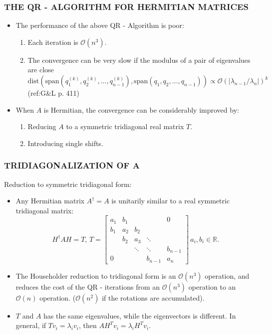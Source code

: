 \documentclass[a4paper,8pt]{beamer} %
\newcommand{\smatrix}[1]{\left[\begin{matrix} #1 \end{matrix}\right]}
\begin{document}
\begin{frame}[label=framelb1]  %
\frametitle{THE QR - ALGORITHM FOR HERMITIAN MATRICES }
\begin{itemize}
\item The performance of the above QR - Algorithm is poor:
	\begin{enumerate}
		\item Each iteration is $\mathcal O(n^3)$.
		\item The convergence can be very slow if the modulus of a pair of eigenvalues are close
		\[ \text{dist}(\text{span}(q_1^{(k)},q_2^{(k)},\dots,q_{n-1}^{(k)})
		,\text{span}(q_1,q_2,\dots,q_{n-1})) \propto \mathcal O(|\lambda_{n-1}/\lambda_n|)^k \]
		(ref:G\&L p. 411)	
		\hyperlink{dist span}{\beamergotobutton{(*)}}
	\end{enumerate}
\item When $A$ is Hermitian, the convergence can be considerably improved by:
	\begin{enumerate}
		\item Reducing $A$ to a symmetric tridiagonal real matrix $T$.
		\item Introducing single shifts. 
	\end{enumerate}
\end{itemize}
\end{frame} %

\begin{frame}[label=tridiagonalizationofa]  %
\frametitle{TRIDIAGONALIZATION OF A}
Reduction to symmetric tridiagonal form:
\begin{itemize}
	\item Any Hermitian matrix $A^\dagger = A$ is unitarily similar to a real symmetric tridiagonal matrix:
\begin{equation}
H^\dagger AH = T,\, 
T=
	\smatrix{
		a_1 & b_1 & & & 0\\
		b_1 & a_2 & b_2 & & \\
		& b_2 & a_3 & \ddots & \\
		& & \ddots	& \ddots & b_{n-1} \\
		0& & & b_{n-1}& a_n 
	}
	\, a_i, b_i \in \mathbb R.
\end{equation}
	\item
		The Householder reduction to tridiagonal form is an $\mathcal O(n^3)$ operation, and reduces the cost of the 
		QR - iterations from an $\mathcal O(n^3)$ operation to an $\mathcal O(n)$ operation. 
		($\mathcal O(n^2)$ if the rotations are accumulated).
	\item 
		$T$ and $A$ has the same eigenvalues, while the eigenvectors 
		is different. In general, if $Tv_i = \lambda_iv_i$, then $A H^T v_i = \lambda_i H^Tv_i$.
\end{itemize}	
\begin{footnotesize}
	\hyperlink{householders explained}{\beamergotobutton{(*)}} 
\end{footnotesize}
\end{frame} %
\end{document}
